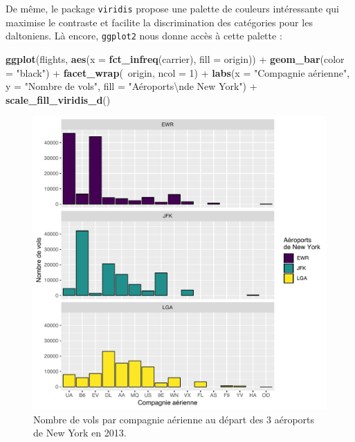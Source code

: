 \documentclass[
  a4paper,
]{article}
\newenvironment{Shaded}{\begin{snugshade}}{\end{snugshade}}
\newcommand{\CharTok}[1]{\textcolor[rgb]{0.57,0.30,0.62}{#1}}
\newcommand{\DataTypeTok}[1]{\textcolor[rgb]{0.00,0.34,0.68}{#1}}
\newcommand{\DecValTok}[1]{\textcolor[rgb]{0.69,0.50,0.00}{#1}}
\newcommand{\KeywordTok}[1]{\textcolor[rgb]{0.12,0.11,0.11}{\textbf{#1}}}
\newcommand{\NormalTok}[1]{\textcolor[rgb]{0.12,0.11,0.11}{#1}}
\newcommand{\OperatorTok}[1]{\textcolor[rgb]{0.12,0.11,0.11}{#1}}
\newcommand{\StringTok}[1]{\textcolor[rgb]{0.75,0.01,0.01}{#1}}
\begin{document}
De même, le package \texttt{viridis} propose une palette de couleurs intéressante qui maximise le contraste et facilite la discrimination des catégories pour les daltoniens. Là encore, \texttt{ggplot2} nous donne accès à cette palette :

\begin{Shaded}
\begin{Highlighting}[]
\KeywordTok{ggplot}\NormalTok{(flights, }\KeywordTok{aes}\NormalTok{(}\DataTypeTok{x =} \KeywordTok{fct_infreq}\NormalTok{(carrier), }\DataTypeTok{fill =}\NormalTok{ origin)) }\OperatorTok{+}
\StringTok{  }\KeywordTok{geom_bar}\NormalTok{(}\DataTypeTok{color =} \StringTok{"black"}\NormalTok{) }\OperatorTok{+}
\StringTok{  }\KeywordTok{facet_wrap}\NormalTok{(}\OperatorTok{~}\NormalTok{origin, }\DataTypeTok{ncol =} \DecValTok{1}\NormalTok{) }\OperatorTok{+}
\StringTok{  }\KeywordTok{labs}\NormalTok{(}\DataTypeTok{x =} \StringTok{"Compagnie aérienne"}\NormalTok{,}
       \DataTypeTok{y =} \StringTok{"Nombre de vols"}\NormalTok{,}
       \DataTypeTok{fill =} \StringTok{"Aéroports}\CharTok{\textbackslash{}n}\StringTok{de New York"}\NormalTok{) }\OperatorTok{+}
\StringTok{  }\KeywordTok{scale_fill_viridis_d}\NormalTok{()}
\end{Highlighting}
\end{Shaded}

\begin{figure}[htpb]

{\centering \includegraphics[width=0.9\linewidth]{figure/barfacetviridis-1} 

}

\caption{Nombre de vols par compagnie aérienne au départ des 3 aéroports de New York en 2013.}\label{fig:barfacetviridis}
\end{figure}
\end{document}
